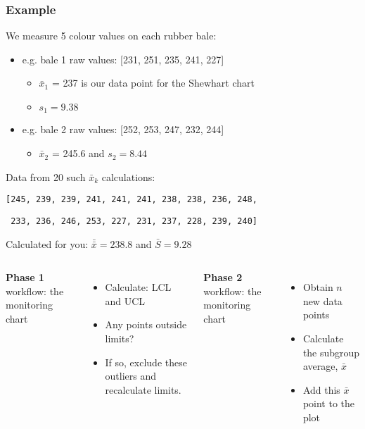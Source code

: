 \begin{frame}\frametitle{Example}

	We measure 5 colour values on each rubber bale:
	\begin{itemize}
		\item	e.g. bale 1 raw values: [231, 251, 235, 241, 227]
		\begin{itemize}
			\item	$\bar{x}_1$ = 237 is our data point for the Shewhart chart
			\item	$s_1 = 9.38$
		\end{itemize}
		\item	e.g. bale 2 raw values: [252, 253, 247, 232, 244]
		\begin{itemize}
			\item	$\bar{x}_2$ = 245.6 and $s_2 = 8.44$
		\end{itemize}
	\end{itemize}

	Data from 20 such $\bar{x}_k$ calculations:

	\texttt{[245, 239, 239, 241, 241, 241, 238, 238, 236, 248, }

	\texttt{ 233, 236, 246, 253, 227, 231, 237, 228, 239, 240]}

	Calculated for you: $\bar{\bar{x}} = 238.8$ and $\bar{S} = 9.28$
	
	\myhrule
	\begin{columns}[t]
			\textbf{Phase 1} workflow: {} the monitoring chart
			\begin{itemize}
				\item	Calculate: LCL and UCL
				\item	Any points outside limits?
				\item	If so, exclude these outliers and recalculate limits.
			\end{itemize}
			\textbf{Phase 2} workflow: {} the monitoring chart
			\begin{itemize}
				\item	Obtain $n$ new data points
				\item	Calculate the subgroup average, $\bar{x}$
				\item	Add this $\bar{x}$ point to the plot
			\end{itemize}
	\end{columns}

	
\end{frame}

